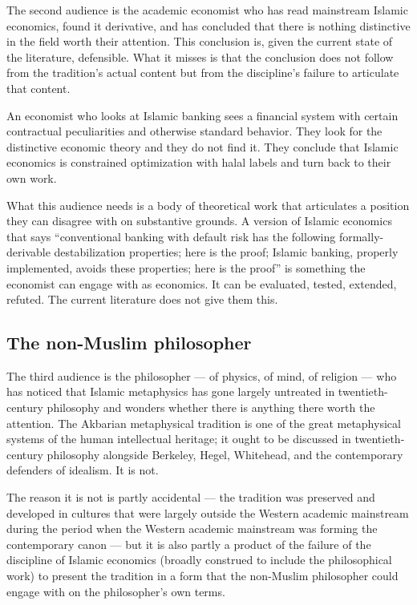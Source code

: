 The second audience is the academic economist who has read mainstream
Islamic economics, found it derivative, and has concluded that there
is nothing distinctive in the field worth their attention. This
conclusion is, given the current state of the literature, defensible.
What it misses is that the conclusion does not follow from the
tradition's actual content but from the discipline's failure to
articulate that content.

An economist who looks at Islamic banking sees a financial system
with certain contractual peculiarities and otherwise standard
behavior. They look for the distinctive economic theory and they do
not find it. They conclude that Islamic economics is constrained
optimization with halal labels and turn back to their own work.

What this audience needs is a body of theoretical work that
articulates a position they can disagree with on substantive grounds.
A version of Islamic economics that says ``conventional banking with
default risk has the following formally-derivable destabilization
properties; here is the proof; Islamic banking, properly implemented,
avoids these properties; here is the proof'' is something the
economist can engage with as economics. It can be evaluated, tested,
extended, refuted. The current literature does not give them this.

\subsection{The non-Muslim philosopher}

The third audience is the philosopher --- of physics, of mind, of
religion --- who has noticed that Islamic metaphysics has gone
largely untreated in twentieth-century philosophy and wonders
whether there is anything there worth the attention. The Akbarian
metaphysical tradition is one of the great metaphysical systems of
the human intellectual heritage; it ought to be discussed in
twentieth-century philosophy alongside Berkeley, Hegel, Whitehead, and
the contemporary defenders of idealism. It is not.

The reason it is not is partly accidental --- the tradition was
preserved and developed in cultures that were largely outside the
Western academic mainstream during the period when the Western
academic mainstream was forming the contemporary canon --- but it is
also partly a product of the failure of the discipline of Islamic
economics (broadly construed to include the philosophical work) to
present the tradition in a form that the non-Muslim philosopher could
engage with on the philosopher's own terms.

